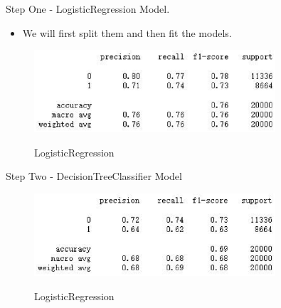 \documentclass[
size=14pt,
paper=smartboard,  %
mode=present, 		%
display=slides, 	%
style=tuliplab,  	%
pauseslide,
fleqn,leqno]{powerdot}
\begin{document}
	
	\begin{slide}{Step One - LogisticRegression Model.}
		\begin{itemize}
			\item
			\smallskip
			We will first split them and then fit the models.
		\end{itemize}
		\begin{figure}
			\centering
			\includegraphics[width=0.8\textwidth]{figures//fig7.eps}\\
			\caption{LogisticRegression}
		\end{figure}
	\end{slide}
	
	
	\begin{slide}{Step Two - DecisionTreeClassifier Model}
		\begin{figure}
			\centering
			\includegraphics[width=0.8\textwidth]{figures//fig8.eps}\\
			\caption{LogisticRegression}
		\end{figure}
	\end{slide}
	
\end{document}
